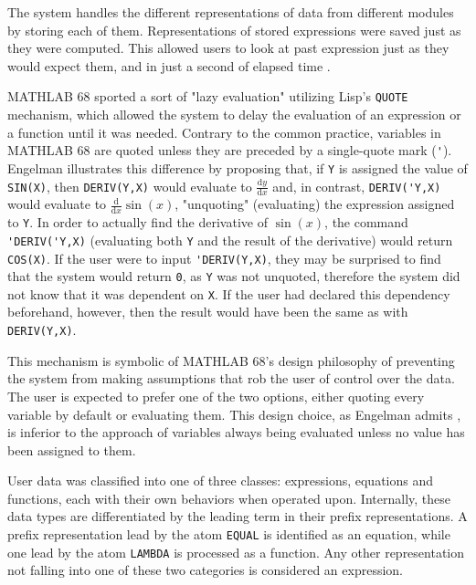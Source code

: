 The system handles the different representations of data from different modules by storing each of them. Representations of stored expressions were saved just as they were computed. This allowed users to look at past expression just as they would expect them, and in just a second of elapsed time \parencite{engelman1971legacy}.

MATHLAB 68 sported a sort of "lazy evaluation" utilizing Lisp's \verb|QUOTE| mechanism, which allowed the system to delay the evaluation of an expression or a function until it was needed. Contrary to the common practice, variables in MATHLAB 68 are quoted unless they are preceded by a single-quote mark (\verb|'|). Engelman \parencite*{engelman1971legacy} illustrates this difference by proposing that, if \verb|Y| is assigned the value of \verb|SIN(X)|, then \verb|DERIV(Y,X)| would evaluate to $\frac{\mathrm{d}y}{\mathrm{d}x}$ and, in contrast, \verb|DERIV('Y,X)| would evaluate to $\frac{\mathrm{d}}{\mathrm{d}x} \sin(x)$, "unquoting" (evaluating) the expression assigned to \verb|Y|. In order to actually find the derivative of $\sin(x)$, the command \verb|'DERIV('Y,X)| (evaluating both \verb|Y| and the result of the derivative) would return \verb|COS(X)|. If the user were to input \verb|'DERIV(Y,X)|, they may be surprised to find that the system would return \verb|0|, as \verb|Y| was not unquoted, therefore the system did not know that it was dependent on \verb|X|. If the user had declared this dependency beforehand, however, then the result would have been the same as with \verb|DERIV(Y,X)|.

This mechanism is symbolic of MATHLAB 68's design philosophy of preventing the system from making assumptions that rob the user of control over the data. The user is expected to prefer one of the two options, either quoting every variable by default or evaluating them. This design choice, as Engelman admits \parencite{engelman1971legacy}, is inferior to the approach of variables always being evaluated unless no value has been assigned to them.

User data was classified into one of three classes: expressions, equations and functions, each with their own behaviors when operated upon. Internally, these data types are differentiated by the leading term in their prefix representations. A prefix representation lead by the atom \verb|EQUAL| is identified as an equation, while one lead by the atom \verb|LAMBDA| is processed as a function. Any other representation not falling into one of these two categories is considered an expression.

